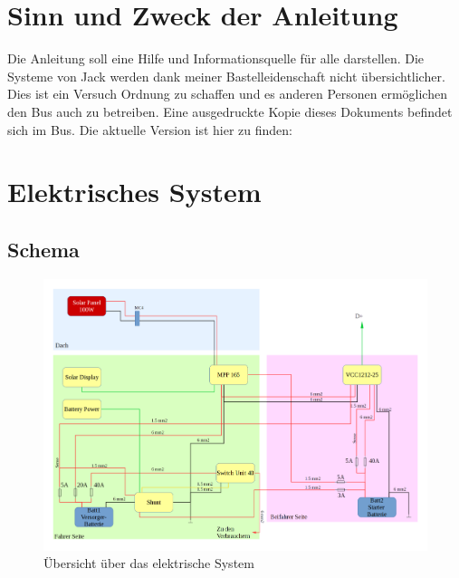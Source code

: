 % 


\section{Sinn und Zweck der Anleitung}
Die Anleitung soll eine Hilfe und Informationsquelle für alle darstellen. 
Die Systeme von Jack werden dank meiner Bastelleidenschaft nicht übersichtlicher.
Dies ist ein Versuch Ordnung zu schaffen und es anderen Personen ermöglichen den Bus auch zu betreiben.
Eine ausgedruckte Kopie dieses Dokuments befindet sich im Bus.
Die aktuelle Version ist hier zu finden:


\section{Elektrisches System}
\subsection{Schema}

\begin{figure}[H]
    \centering
    \includegraphics[scale=0.3, angle=90]{../Bilder/Anleitung/EL_System.png}
	\caption{Übersicht über das elektrische System}
	\label{Schema}
\end{figure}

